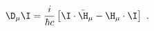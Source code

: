 \begin{equation}
    \label{eq:calI}
    \D_{\mu} \I = \frac{i}{\hbar c} \left[\I\cdot\bar{\H}_\mu - \H_\mu\cdot\I \right]\ .
  \end{equation}

